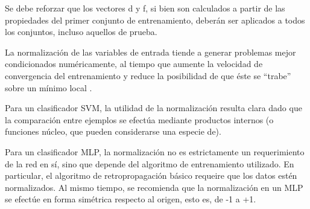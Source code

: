 \documentclass[12pt,bibliography=oldstyle,DIV=12,parskip=half-]{scrreprt}
\begin{document}
Se debe reforzar que los vectores d y f, si bien son calculados a
partir de las propiedades del primer conjunto de entrenamiento,
deberán ser aplicados a todos los conjuntos, incluso aquellos de
prueba.

La normalización de las variables de entrada tiende a generar
problemas mejor condicionados numéricamente, al tiempo que aumente la
velocidad de convergencia del entrenamiento y reduce la posibilidad de
que éste se ``trabe'' sobre un mínimo local \cite{nnfaq2}.

Para un clasificador SVM, la utilidad de la normalización resulta
clara dado que la comparación entre ejemplos se efectúa mediante
productos internos (o funciones núcleo, que pueden considerarse una
especie de).

Para un clasificador MLP, la normalización no es estrictamente un
requerimiento de la red en sí, sino que depende del algoritmo de
entrenamiento utilizado. En particular, el algoritmo de
retropropagación básico requeire que los datos estén normalizados.  Al
mismo tiempo, se recomienda que la normalización en un MLP se efectúe
en forma simétrica respecto al origen, esto es, de -1 a +1.


%
\end{document}
